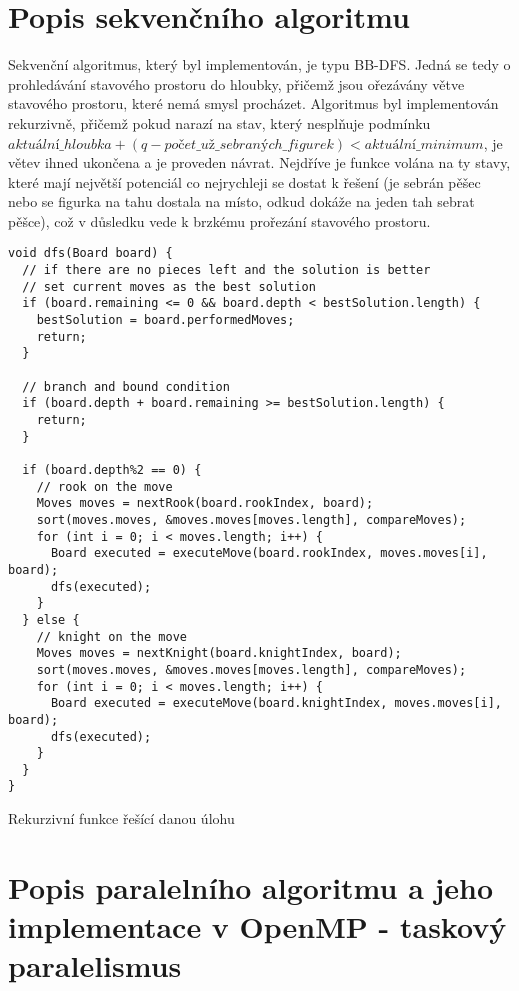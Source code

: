 \documentclass[a4paper,10pt]{article}
\begin{document}
\section{Popis sekvenčního algoritmu}
Sekvenční algoritmus, který byl implementován, je typu BB-DFS. Jedná se tedy o prohledávání stavového prostoru do hloubky, přičemž jsou ořezávány větve stavového prostoru, které nemá smysl procházet. Algoritmus byl implementován rekurzivně, přičemž pokud narazí na stav, který nesplňuje podmínku $aktuální\_hloubka + (q - počet\_už\_sebraných\_figurek) < aktuální\_minimum$, je větev ihned ukončena a je proveden návrat. Nejdříve je funkce volána na ty stavy, které mají největší potenciál co nejrychleji se dostat k řešení (je sebrán pěšec nebo se figurka na tahu dostala na místo, odkud dokáže na jeden tah sebrat pěšce), což v důsledku vede k brzkému prořezání stavového prostoru.

\pagebreak

\begin{listing}[H]
\begin{verbatim}
void dfs(Board board) {
  // if there are no pieces left and the solution is better
  // set current moves as the best solution
  if (board.remaining <= 0 && board.depth < bestSolution.length) {
    bestSolution = board.performedMoves;
    return;
  }

  // branch and bound condition
  if (board.depth + board.remaining >= bestSolution.length) {
    return;
  }

  if (board.depth%2 == 0) {
    // rook on the move
    Moves moves = nextRook(board.rookIndex, board);
    sort(moves.moves, &moves.moves[moves.length], compareMoves);
    for (int i = 0; i < moves.length; i++) {
      Board executed = executeMove(board.rookIndex, moves.moves[i], board);
      dfs(executed);
    }
  } else {
    // knight on the move
    Moves moves = nextKnight(board.knightIndex, board);
    sort(moves.moves, &moves.moves[moves.length], compareMoves);
    for (int i = 0; i < moves.length; i++) {
      Board executed = executeMove(board.knightIndex, moves.moves[i], board);
      dfs(executed);
    }
  }
}
\end{verbatim}
\caption{Rekurzivní funkce řešící danou úlohu}
\end{listing}

\section{Popis paralelního algoritmu a jeho implementace v OpenMP - taskový paralelismus}
\end{document}

